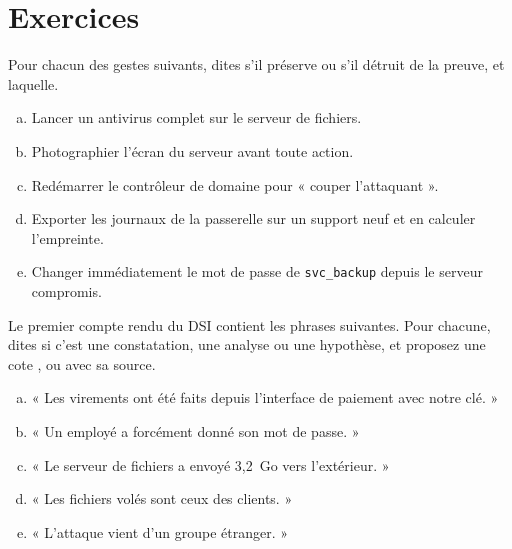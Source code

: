 \section*{Exercices}

\begin{boxexo}[title={\ding{45}\quad Exercice~0.1. Préserver ou détruire \niveaubase}]
Pour chacun des gestes suivants, dites s'il préserve ou s'il détruit de la
preuve, et laquelle.
\begin{enumerate}[(a)]
    \item Lancer un antivirus complet sur le serveur de fichiers.
    \item Photographier l'écran du serveur avant toute action.
    \item Redémarrer le contrôleur de domaine pour « couper l'attaquant ».
    \item Exporter les journaux de la passerelle sur un support neuf et en
          calculer l'empreinte.
    \item Changer immédiatement le mot de passe de \texttt{svc\_backup}
          depuis le serveur compromis.
\end{enumerate}
\end{boxexo}

\begin{boxexo}[title={\ding{45}\quad Exercice~0.2. Constatation ou analyse \niveaumoyen}]
Le premier compte rendu du DSI contient les phrases suivantes. Pour
chacune, dites si c'est une constatation, une analyse ou une hypothèse, et
proposez une cote \OUI{}, \NON{} ou \NEK{} avec sa source.
\begin{enumerate}[(a)]
    \item « Les virements ont été faits depuis l'interface de paiement avec
          notre clé. »
    \item « Un employé a forcément donné son mot de passe. »
    \item « Le serveur de fichiers a envoyé 3,2~Go vers l'extérieur. »
    \item « Les fichiers volés sont ceux des clients. »
    \item « L'attaque vient d'un groupe étranger. »
\end{enumerate}
\end{boxexo}

